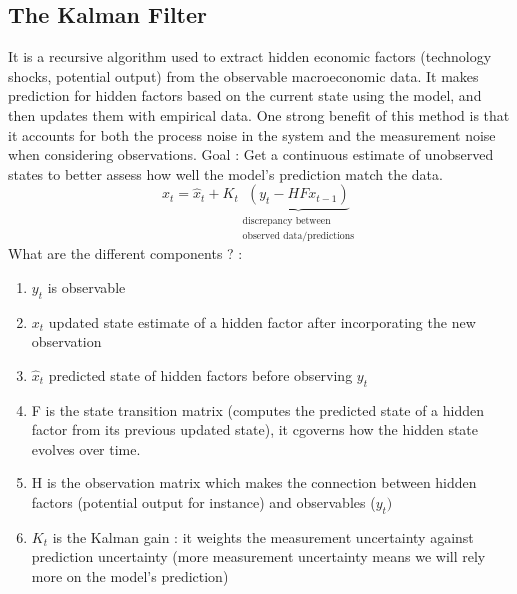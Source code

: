 \documentclass{article}
\begin{document}
\subsection{The Kalman Filter}
It is a recursive algorithm used to extract hidden economic factors (technology shocks, potential output) from the observable macroeconomic data. It makes prediction for hidden factors based on the current state using the model, and then updates them with empirical data. One strong benefit of this method is that it accounts for both the process noise in the system and  the measurement noise when considering observations. 
Goal : Get a continuous estimate of unobserved states to better assess how well the model's prediction match the data.
\begin{equation}
    x_t = \hat{x}_t + K_t\underbrace{(y_t-HFx_{t-1})}_{\substack{\text{discrepancy between}\\\text{observed data/predictions}}}
\end{equation}
What are the different components ? : 
\begin{enumerate}
    \item $y_t$ is observable 
    \item $x_t$ updated state estimate of a hidden factor after incorporating the new observation
    \item $\hat{x}_t$ predicted state of hidden factors before observing $y_t$
    \item F is the state transition matrix (computes the predicted state of a hidden factor from its previous updated state), it cgoverns how the hidden state evolves over time. 
    \item H is the observation matrix which makes the connection between hidden factors (potential output for instance) and observables ($y_t)$
    \item $K_t$ is the Kalman gain : it weights the measurement uncertainty against prediction uncertainty (more measurement uncertainty means we will rely more on the model's prediction)
\end{enumerate} 
\end{document}
